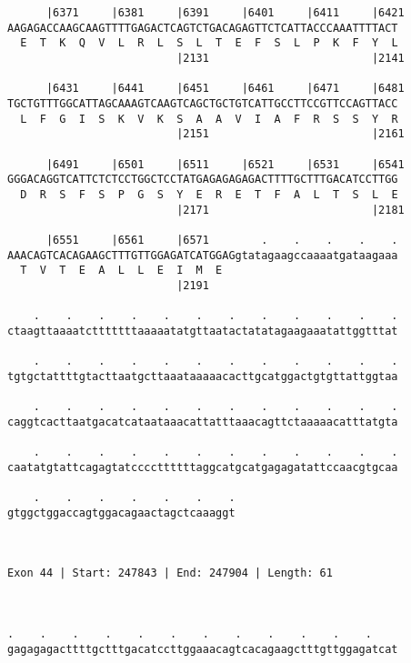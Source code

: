 \documentclass{article}
\begin{document}
\begin{Verbatim}
      |6371     |6381     |6391     |6401     |6411     |6421
AAGAGACCAAGCAAGTTTTGAGACTCAGTCTGACAGAGTTCTCATTACCCAAATTTTACT
  E  T  K  Q  V  L  R  L  S  L  T  E  F  S  L  P  K  F  Y  L
                          |2131                         |2141
  
      |6431     |6441     |6451     |6461     |6471     |6481
TGCTGTTTGGCATTAGCAAAGTCAAGTCAGCTGCTGTCATTGCCTTCCGTTCCAGTTACC
  L  F  G  I  S  K  V  K  S  A  A  V  I  A  F  R  S  S  Y  R
                          |2151                         |2161
  
      |6491     |6501     |6511     |6521     |6531     |6541
GGGACAGGTCATTCTCTCCTGGCTCCTATGAGAGAGAGACTTTTGCTTTGACATCCTTGG
  D  R  S  F  S  P  G  S  Y  E  R  E  T  F  A  L  T  S  L  E
                          |2171                         |2181
  
      |6551     |6561     |6571        .    .    .    .    .
AAACAGTCACAGAAGCTTTGTTGGAGATCATGGAGgtatagaagccaaaatgataagaaa
  T  V  T  E  A  L  L  E  I  M  E                           
                          |2191                             
  
    .    .    .    .    .    .    .    .    .    .    .    .
ctaagttaaaatctttttttaaaaatatgttaatactatatagaagaaatattggtttat
                                                            
    .    .    .    .    .    .    .    .    .    .    .    .
tgtgctattttgtacttaatgcttaaataaaaacacttgcatggactgtgttattggtaa
                                                            
    .    .    .    .    .    .    .    .    .    .    .    .
caggtcacttaatgacatcataataaacattatttaaacagttctaaaaacatttatgta
                                                            
    .    .    .    .    .    .    .    .    .    .    .    .
caatatgtattcagagtatccccttttttaggcatgcatgagagatattccaacgtgcaa
                                                            
    .    .    .    .    .    .    .
gtggctggaccagtggacagaactagctcaaaggt
                                   
                                   
 
Exon 44 | Start: 247843 | End: 247904 | Length: 61



.    .    .    .    .    .    .    .    .    .    .    .    
gagagagacttttgctttgacatccttggaaacagtcacagaagctttgttggagatcat
                                                            

\end{Verbatim}
\end{document}

